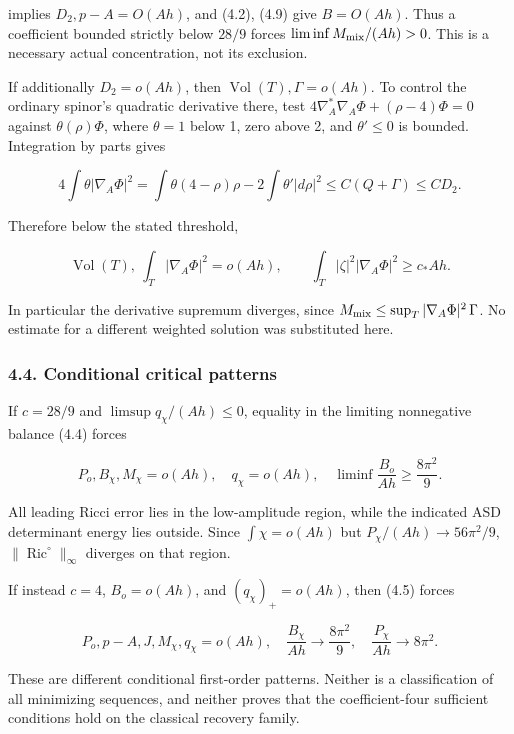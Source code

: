 \documentclass[
  11pt,
]{article}
\begin{document}
implies \(D_2,p-A=O(Ah)\), and (4.2), (4.9) give \(B=O(Ah)\). Thus a
coefficient bounded strictly below \(28/9\) forces
\(\liminf M_{\rm mix}/(Ah)>0\). This is a necessary actual
concentration, not its exclusion.

If additionally \(D_2=o(Ah)\), then
\(\operatorname{Vol}(T),\Gamma=o(Ah)\). To control the ordinary spinor's
quadratic derivative there, test
\(4\nabla_A^*\nabla_A\Phi+(\rho-4)\Phi=0\) against \(\theta(\rho)\Phi\),
where \(\theta=1\) below 1, zero above 2, and \(\theta'\le0\) is
bounded. Integration by parts gives

\[
 4\int\theta|\nabla_A\Phi|^2
  =\int\theta(4-\rho)\rho-2\int\theta'|d\rho|^2
  \le C(Q+\Gamma)\le CD_2.
 \tag{4.11}
\]

Therefore below the stated threshold,

\[
 \operatorname{Vol}(T),\ \int_T|\nabla_A\Phi|^2=o(Ah),
 \qquad \int_T|\zeta|^2|\nabla_A\Phi|^2\ge c_*Ah.
 \tag{4.12}
\]

In particular the derivative supremum diverges, since
\(M_{\rm mix}\le\sup_T|\nabla_A\Phi|^2\,\Gamma\). No estimate for a
different weighted solution was substituted here.

\hypertarget{conditional-critical-patterns}{%
\subsubsection{4.4. Conditional critical
patterns}\label{conditional-critical-patterns}}

If \(c=28/9\) and \(\limsup q_\chi/(Ah)\le0\), equality in the limiting
nonnegative balance (4.4) forces

\[
 P_o,B_\chi,M_\chi=o(Ah),\quad q_\chi=o(Ah),\quad
 \liminf\frac{B_o}{Ah}\ge\frac{8\pi^2}{9}.
 \tag{4.13}
\]

All leading Ricci error lies in the low-amplitude region, while the
indicated ASD determinant energy lies outside. Since \(\int\chi=o(Ah)\)
but \(P_\chi/(Ah)\to56\pi^2/9\),
\(\|\operatorname{Ric}^{\circ}\|_\infty\) diverges on that region.

If instead \(c=4\), \(B_o=o(Ah)\), and \((q_\chi)_+=o(Ah)\), then (4.5)
forces

\[
 P_o,p-A,J,M_\chi,q_\chi=o(Ah),\quad
 \frac{B_\chi}{Ah}\to\frac{8\pi^2}{9},\quad
 \frac{P_\chi}{Ah}\to8\pi^2.
 \tag{4.14}
\]

These are different conditional first-order patterns. Neither is a
classification of all minimizing sequences, and neither proves that the
coefficient-four sufficient conditions hold on the classical recovery
family.
\end{document}
